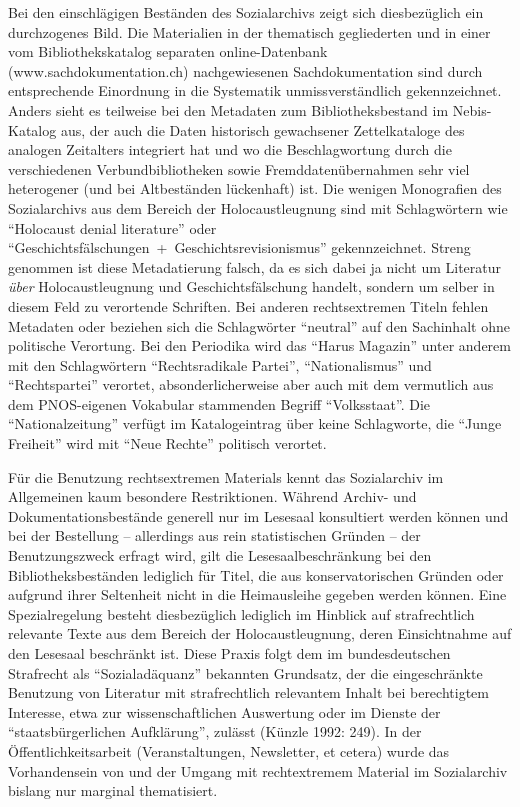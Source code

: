 \documentclass[a4paper,
fontsize=11pt,
oneside,
numbers=noperiodatend,
parskip=half-,
bibliography=totoc,
final
]{scrartcl}
\begin{document}
Bei den einschlägigen Beständen des Sozialarchivs zeigt sich
diesbezüglich ein durchzogenes Bild. Die Materialien in der thematisch
gegliederten und in einer vom Bibliothekskatalog separaten
online-Datenbank (www.sachdokumentation.ch) nachgewiesenen
Sachdokumentation sind durch entsprechende Einordnung in die Systematik
unmissverständlich gekennzeichnet. Anders sieht es teilweise bei den
Metadaten zum Bibliotheksbestand im Nebis-Katalog aus, der auch die
Daten historisch gewachsener Zettelkataloge des analogen Zeitalters
integriert hat und wo die Beschlagwortung durch die verschiedenen
Verbundbibliotheken sowie Fremddatenübernahmen sehr viel heterogener
(und bei Altbeständen lückenhaft) ist. Die wenigen Monografien des
Sozialarchivs aus dem Bereich der Holocaustleugnung sind mit
Schlagwörtern wie \enquote{Holocaust denial literature} oder
\enquote{Geschichtsfälschungen~+~Geschichtsrevisionismus}
gekennzeichnet. Streng genommen ist diese Metadatierung falsch, da es
sich dabei ja nicht um Literatur \emph{über} Holocaustleugnung und
Geschichtsfälschung handelt, sondern um selber in diesem Feld zu
verortende Schriften. Bei anderen rechtsextremen Titeln fehlen Metadaten
oder beziehen sich die Schlagwörter \enquote{neutral} auf den Sachinhalt
ohne politische Verortung. Bei den Periodika wird das \enquote{Harus
Magazin} unter anderem mit den Schlagwörtern \enquote{Rechtsradikale
Partei}, \enquote{Nationalismus} und \enquote{Rechtspartei} verortet,
absonderlicherweise aber auch mit dem vermutlich aus dem PNOS-eigenen
Vokabular stammenden Begriff \enquote{Volksstaat}. Die
\enquote{Nationalzeitung} verfügt im Katalogeintrag über keine
Schlagworte, die \enquote{Junge Freiheit} wird mit \enquote{Neue Rechte}
politisch verortet.

Für die Benutzung rechtsextremen Materials kennt das Sozialarchiv im
Allgemeinen kaum besondere Restriktionen. Während Archiv- und
Dokumentationsbestände generell nur im Lesesaal konsultiert werden
können und bei der Bestellung -- allerdings aus rein statistischen
Gründen -- der Benutzungszweck erfragt wird, gilt die
Lesesaalbeschränkung bei den Bibliotheksbeständen lediglich für Titel,
die aus konservatorischen Gründen oder aufgrund ihrer Seltenheit nicht
in die Heimausleihe gegeben werden können. Eine Spezialregelung besteht
diesbezüglich lediglich im Hinblick auf strafrechtlich relevante Texte
aus dem Bereich der Holocaustleugnung, deren Einsichtnahme auf den
Lesesaal beschränkt ist. Diese Praxis folgt dem im bundesdeutschen
Strafrecht als \enquote{Sozialadäquanz} bekannten Grundsatz, der die
eingeschränkte Benutzung von Literatur mit strafrechtlich relevantem
Inhalt bei berechtigtem Interesse, etwa zur wissenschaftlichen
Auswertung oder im Dienste der \enquote{staatsbürgerlichen Aufklärung},
zulässt (Künzle 1992: 249). In der Öffentlichkeitsarbeit
(Veranstaltungen, Newsletter, et cetera) wurde das Vorhandensein von und
der Umgang mit rechtextremem Material im Sozialarchiv bislang nur
marginal thematisiert.
\end{document}
